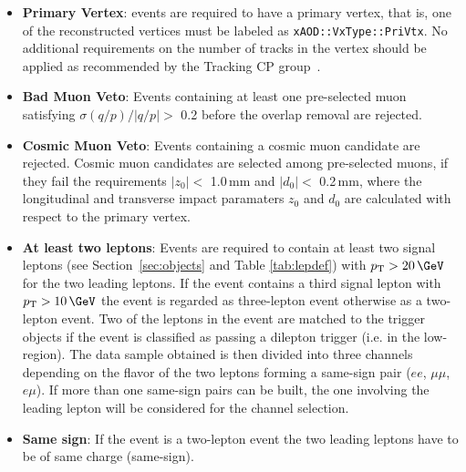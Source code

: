 \begin{itemize}
\item{ \textbf{Primary Vertex}: events are required to have a primary vertex, that is, one of the reconstructed vertices
   must be labeled as {\tt{xAOD::VxType::PriVtx}}. No additional requirements on the number of tracks in the 
   vertex should be applied as recommended by the Tracking CP group~\cite{vertex_twiki}.
}

\item{ \textbf{Bad Muon Veto}:  Events containing at least one pre-selected muon satisfying $\sigma(q/p)/|q/p| >$ 0.2 before the overlap removal are rejected.}

\item{ \textbf{Cosmic Muon Veto}: Events containing a cosmic muon candidate are rejected. Cosmic muon candidates are selected among pre-selected muons, if they fail the requirements $|z_0| <$ 1.0\,mm and $|d_0| <$ 0.2\,mm, where the longitudinal and transverse impact paramaters $z_0$ and $d_0$ are calculated with respect to the primary vertex.}

\item{ \textbf{At least two leptons}: Events are required to contain
    at least two signal leptons (see Section~\ref{sec:objects} and
    Table \ref{tab:lepdef}) with $p_{\mathrm{T}}
    > 20\,\GeV$ for the two leading leptons. 
    If the event contains a third signal lepton with $p_{\mathrm{T}} > 10\,\GeV$ the event is regarded as three-lepton
    event otherwise as a two-lepton event. 
	Two of the leptons in the event are matched to the trigger objects 
    if the event is classified as passing a dilepton trigger (i.e. in the low-\met region).
    The data sample obtained is then divided into three channels depending on the flavor of the two 
    leptons forming a same-sign pair ($ee$, $\mu\mu$, $e\mu$). If more than one same-sign pairs can be built, 
    the one involving the leading lepton will be considered for the channel selection.}

\item{ \textbf{Same sign}: If the event is a two-lepton event the two leading leptons have to be of 
    same charge (same-sign).}
    

\end{itemize}


